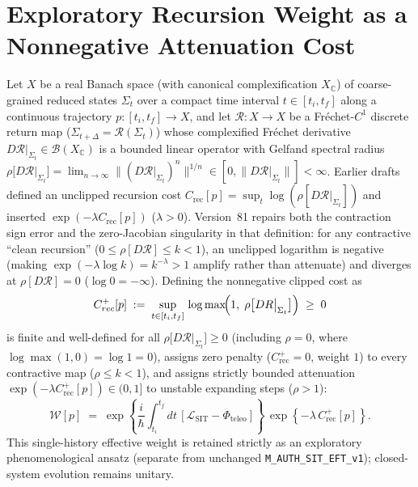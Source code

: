 \section{Exploratory Recursion Weight as a Nonnegative Attenuation Cost}
\label{sec:recursion-influence}
\label{app:recursion-influence}
Let $X$ be a real Banach space (with canonical complexification $X_{\mathbb{C}}$) of coarse-grained reduced states $\Sigma_t$ over a compact time interval $t \in [t_i, t_f]$ along a continuous trajectory $p : [t_i, t_f] \to X$, and let $\mathcal{R} : X \to X$ be a Fr\'echet-$C^1$ discrete return map ($\Sigma_{t+\Delta}=\mathcal{R}(\Sigma_t)$) whose complexified Fr\'echet derivative $D\mathcal{R}|_{\Sigma_t} \in \mathcal{B}(X_{\mathbb{C}})$ is a bounded linear operator with Gelfand spectral radius $\rho\bigl[D\mathcal{R}|_{\Sigma_t}\bigr] = \lim_{n\to\infty}\|(D\mathcal{R}|_{\Sigma_t})^n\|^{1/n} \in [0, \|D\mathcal{R}|_{\Sigma_t}\|] < \infty$. Earlier drafts defined an unclipped recursion cost $C_{\mathrm{rec}}[p] = \sup_t \log(\rho[D\mathcal{R}|_{\Sigma_t}])$ and inserted $\exp(-\lambda C_{\mathrm{rec}}[p])$ ($\lambda > 0$). Version~81 repairs both the contraction sign error and the zero-Jacobian singularity in that definition: for any contractive ``clean recursion'' ($0 \le \rho[D\mathcal{R}] \le k < 1$), an unclipped logarithm is negative (making $\exp(-\lambda\log k) = k^{-\lambda} > 1$ amplify rather than attenuate) and diverges at $\rho[D\mathcal{R}] = 0$ ($\log 0 = -\infty$). Defining the nonnegative clipped cost as
\begin{equation}
C_{\mathrm{rec}}^+[p] \;:=\; \sup_{t \in [t_i, t_f]}\,\log\max\!\Bigl(1,\;\rho\bigl[D\mathcal{R}\big|_{\Sigma_t}\bigr]\Bigr) \;\ge\; 0
\label{eq:nonneg_recursion_cost}
\end{equation}
is finite and well-defined for all $\rho\bigl[D\mathcal{R}|_{\Sigma_t}\bigr] \ge 0$ (including $\rho = 0$, where $\log\max(1, 0) = \log 1 = 0$), assigns zero penalty ($C_{\mathrm{rec}}^+ = 0$, weight $1$) to every contractive map ($\rho \le k < 1$), and assigns strictly bounded attenuation $\exp(-\lambda C_{\mathrm{rec}}^+[p]) \in (0, 1]$ to unstable expanding steps ($\rho > 1$):
\[
\mathcal{W}[p] \;=\; \exp\!\left\{\frac{i}{\hbar}\!\int_{t_i}^{t_f}\!dt\,[\mathcal{L}_{\mathrm{SIT}}-\Phi_{\mathrm{teleo}}]\right\}\,
\exp\!\left\{-\lambda\,C_{\mathrm{rec}}^+[p]\right\}.
\]
This single-history effective weight is retained strictly as an exploratory phenomenological ansatz (separate from unchanged \texttt{M\_AUTH\_SIT\_EFT\_v1}); closed-system evolution remains unitary.

